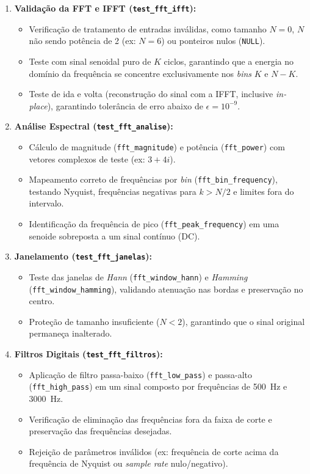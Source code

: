\documentclass[12pt, a4paper]{article}
\begin{document}
\begin{enumerate}
    \item \textbf{Validação da FFT e IFFT (\texttt{test\_fft\_ifft}):}
    \begin{itemize}
        \item Verificação de tratamento de entradas inválidas, como tamanho $N = 0$, $N$ não sendo potência de 2 (ex: $N = 6$) ou ponteiros nulos (\texttt{NULL}).
        \item Teste com sinal senoidal puro de $K$ ciclos, garantindo que a energia no domínio da frequência se concentre exclusivamente nos \emph{bins} $K$ e $N-K$.
        \item Teste de ida e volta (reconstrução do sinal com a IFFT, inclusive \emph{in-place}), garantindo tolerância de erro abaixo de $\epsilon = 10^{-9}$.
    \end{itemize}

    \item \textbf{Análise Espectral (\texttt{test\_fft\_analise}):}
    \begin{itemize}
        \item Cálculo de magnitude (\texttt{fft\_magnitude}) e potência (\texttt{fft\_power}) com vetores complexos de teste (ex: $3 + 4i$).
        \item Mapeamento correto de frequências por \emph{bin} (\texttt{fft\_bin\_frequency}), testando Nyquist, frequências negativas para $k > N/2$ e limites fora do intervalo.
        \item Identificação da frequência de pico (\texttt{fft\_peak\_frequency}) em uma senoide sobreposta a um sinal contínuo (DC).
    \end{itemize}

    \item \textbf{Janelamento (\texttt{test\_fft\_janelas}):}
    \begin{itemize}
        \item Teste das janelas de \emph{Hann} (\texttt{fft\_window\_hann}) e \emph{Hamming} (\texttt{fft\_window\_hamming}), validando atenuação nas bordas e preservação no centro.
        \item Proteção de tamanho insuficiente ($N < 2$), garantindo que o sinal original permaneça inalterado.
    \end{itemize}

    \item \textbf{Filtros Digitais (\texttt{test\_fft\_filtros}):}
    \begin{itemize}
        \item Aplicação de filtro passa-baixo (\texttt{fft\_low\_pass}) e passa-alto (\texttt{fft\_high\_pass}) em um sinal composto por frequências de 500~Hz e 3000~Hz.
        \item Verificação de eliminação das frequências fora da faixa de corte e preservação das frequências desejadas.
        \item Rejeição de parâmetros inválidos (ex: frequência de corte acima da frequência de Nyquist ou \emph{sample rate} nulo/negativo).
    \end{itemize}
\end{enumerate}
\end{document}
